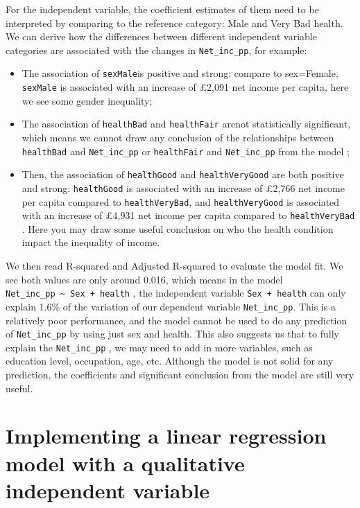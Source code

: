 \documentclass[
  letterpaper,
  DIV=11,
  numbers=noendperiod]{scrreprt}
\providecommand{\tightlist}{%
  \setlength{\itemsep}{0pt}\setlength{\parskip}{0pt}}\usepackage{longtable,booktabs,array}
\begin{document}
For the independent variable, the coefficient estimates of them need to
be interpreted by comparing to the reference category: Male and Very Bad
health. We can derive how the differences between different independent
variable categories are associated with the changes in
\texttt{Net\_inc\_pp}, for example:

\begin{itemize}
\tightlist
\item
  The association of \texttt{sexMale}is positive and strong: compare to
  sex=Female, \texttt{sexMale} is associated with an increase of £2,091
  net income per capita, here we see some gender inequality;
\item
  The association of \texttt{healthBad} and \texttt{healthFair} arenot
  statistically significant, which means we cannot draw any conclusion
  of the relationships between \texttt{healthBad} and
  \texttt{Net\_inc\_pp} or \texttt{healthFair} and \texttt{Net\_inc\_pp}
  from the model ;
\item
  Then, the association of \texttt{healthGood} and
  \texttt{healthVeryGood} are both positive and strong:
  \texttt{healthGood} is associated with an increase of £2,766 net
  income per capita compared to \texttt{healthVeryBad}, and
  \texttt{healthVeryGood} is associated with an increase of £4,931 net
  income per capita compared to \texttt{healthVeryBad} . Here you may
  draw some useful conclusion on who the health condition impact the
  inequality of income.
\end{itemize}

We then read R-squared and Adjusted R-squared to evaluate the model fit.
We see both values are only around 0.016, which means in the model
\texttt{Net\_inc\_pp\ \textasciitilde{}\ Sex\ +\ health} , the
independent variable \texttt{Sex\ +\ health} can only explain 1.6\% of
the variation of our dependent variable \texttt{Net\_inc\_pp}. This is a
relatively poor performance, and the model cannot be used to do any
prediction of \texttt{Net\_inc\_pp} by using just sex and health. This
also suggests us that to fully explain the \texttt{Net\_inc\_pp} , we
may need to add in more variables, such as education level, occupation,
age, etc. Although the model is not solid for any prediction, the
coefficients and significant conclusion from the model are still very
useful.

\section{\texorpdfstring{\textbf{Implementing a linear regression model
with a qualitative independent
variable}}{Implementing a linear regression model with a qualitative independent variable}}\label{implementing-a-linear-regression-model-with-a-qualitative-independent-variable}
\end{document}
